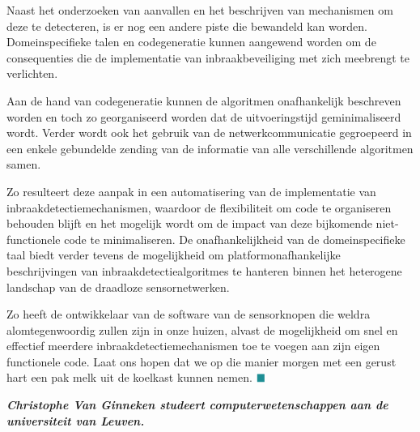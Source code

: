 \documentclass[DIV=calc,paper=a4,fontsize=11pt,twocolumn,draft]{scrartcl}
\begin{document}
Naast het onderzoeken van aanvallen en het beschrijven van mechanismen om deze
te detecteren, is er nog een andere piste die bewandeld kan worden.
Domeinspecifieke talen en codegeneratie kunnen aangewend worden om de
consequenties die de implementatie van inbraakbeveiliging met zich meebrengt te
verlichten.

Aan de hand van codegeneratie kunnen de algoritmen onafhankelijk beschreven
worden en toch zo georganiseerd worden dat de uitvoeringstijd geminimaliseerd
wordt. Verder wordt ook het gebruik van de netwerkcommunicatie gegroepeerd in
een enkele gebundelde zending van de informatie van alle verschillende
algoritmen samen.

Zo resulteert deze aanpak in een automatisering van de implementatie van
inbraakdetectiemechanismen, waardoor de flexibiliteit om code te organiseren
behouden blijft en het mogelijk wordt om de impact van deze bijkomende
niet-functionele code te minimaliseren. De onafhankelijkheid van de
domeinspecifieke taal biedt verder tevens de mogelijkheid om
platformonafhankelijke beschrijvingen van inbraakdetectiealgoritmes te hanteren
binnen het heterogene landschap van de draadloze sensornetwerken.

Zo heeft de ontwikkelaar van de software van de sensorknopen die weldra
alomtegenwoordig zullen zijn in onze huizen, alvast de mogelijkheid om snel en
effectief meerdere inbraakdetectiemechanismen toe te voegen aan zijn eigen
functionele code. Laat ons hopen dat we op die manier morgen met een gerust
hart een pak melk uit de koelkast kunnen nemen. $\color{BaseColor}\blacksquare$

\vspace{0.6cm}

\bf{\emph{Christophe Van Ginneken studeert computerwetenschappen aan de
universiteit van Leuven.}}
\end{document}
